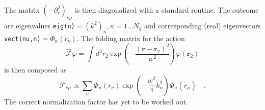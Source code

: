 \documentclass[12pt]{article}
\begin{document}
The matrix $(-\partial_r^2)_{\nu\mu}$ is then diagonalized with a
standard routine. The outcome are eigenvalues \texttt{eig(n)}$=(k^2)_n, n=1...N_g$ and
corresponding (real) eigenvectors \texttt{vect(nu,n)}$=\Phi_n(r_\nu)$.
The folding matrix for the action
\begin{equation}
  \hat{\mathcal{F}}\varphi
  =
  \int d^3r_2\exp\left(-\frac{(\mathbf{r}-\mathbf{r}_2)^2}{w^2}\right)\varphi(\mathbf{r}_2)
\end{equation}
is then composed as
\begin{equation}
  \mathcal{F}_{\nu\mu}
  \propto
  \sum_n\Phi_n(r_\nu)\exp\left(-\frac{w^2}{4}k^2_n\right)\Phi_n(r_\mu)
  \quad.
\end{equation}
The correct normalization factor has yet to be worked out.
\end{document}
